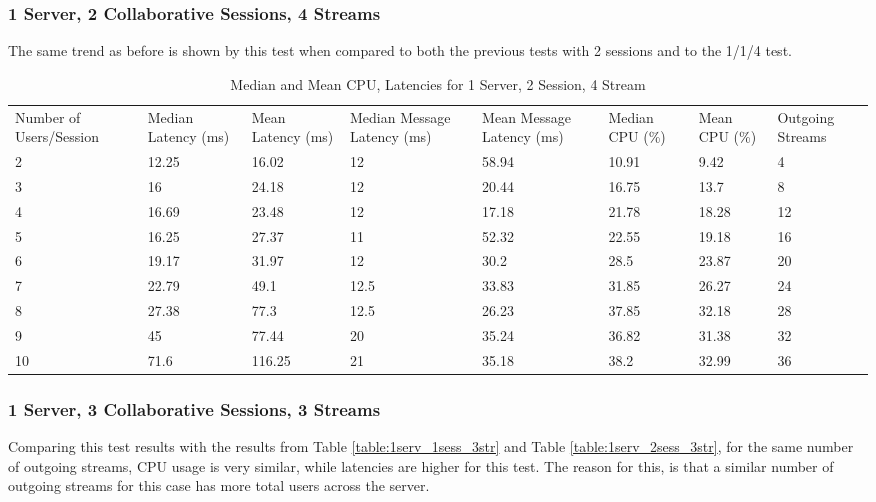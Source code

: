 \clearpage\subsubsection{1 Server, 2 Collaborative Sessions, 4 Streams}
\label{sec:1serv_2sess_4str}

The same trend as before is shown by this test when compared to both the previous tests with 2 sessions and to the 1/1/4 test.

\begin{table}
\caption{Median and Mean CPU, Latencies for 1 Server, 2 Session, 4 Stream}
\label{table:1serv_2sess_4str}
\begin{tabu} to\linewidth{|X[c]|X[c]|X[c]|X[c]|X[c]|X[c]|X[c]|X[c]|}
\everyrow{\hline}
\hline
Number of Users/Session & Median Latency (ms) & Mean Latency (ms) & Median Message Latency (ms) & Mean Message Latency (ms) & Median CPU (\%) & Mean CPU (\%) & Outgoing Streams\\
2 & 12.25 & 16.02 & 12 & 58.94 & 10.91 & 9.42 & 4 \\
3 & 16 & 24.18 & 12 & 20.44 & 16.75 & 13.7 & 8 \\
4 & 16.69 & 23.48 & 12 & 17.18 & 21.78 & 18.28 & 12 \\
5 & 16.25 & 27.37 & 11 & 52.32 & 22.55 & 19.18 & 16 \\
6 & 19.17 & 31.97 & 12 & 30.2 & 28.5 & 23.87 & 20 \\
7 & 22.79 & 49.1 & 12.5 & 33.83 & 31.85 & 26.27 & 24 \\
8 & 27.38 & 77.3 & 12.5 & 26.23 & 37.85 & 32.18 & 28 \\
9 & 45 & 77.44 & 20 & 35.24 & 36.82 & 31.38 & 32 \\
10 & 71.6 & 116.25 & 21 & 35.18 & 38.2 & 32.99 & 36 \\
\end{tabu}
\end{table}

\clearpage\subsubsection{1 Server, 3 Collaborative Sessions, 3 Streams}
\label{sec:1serv_3sess_3str}

Comparing this test results with the results from Table \ref{table:1serv_1sess_3str} and Table \ref{table:1serv_2sess_3str}, for the same number of outgoing streams, CPU usage is very similar, while latencies are higher for this test. The reason for this, is that a similar number of outgoing streams for this case has more total users across the server.

